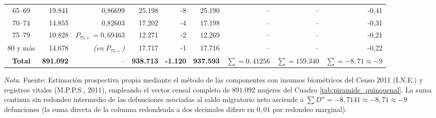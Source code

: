 \documentclass[12pt,letterpaper]{article}
\begin{document}
\begin{table}[htbp]
{\begin{tabular}{crrrrrrrr}
        65--69 & 19.841 & 0,86699 & 25.198 & -8 & 25.190 & -- & -- & -0,41 \\
        70--74 & 14.855 & 0,82603 & 17.202 & -4 & 17.198 & -- & -- & -0,31 \\
        75--79 & 10.828 & $P_{75+} = 0{,}69463$ & 12.271 & -2 & 12.269 & -- & -- & -0,21 \\
        80 y más & 14.678 & \textit{(en $P_{75+}$)} & 17.717 & -1 & 17.716 & -- & -- & -0,22 \\
        \midrule
        \textbf{Total} & \textbf{891.092} & -- & \textbf{938.713} & \textbf{-1.120} & \textbf{937.593} & $\sum = 0{,}41256$ & $\sum = 159.340$ & $\sum = -8{,}71 \approx -9$ \\
        \bottomrule
    \end{tabular}%
    }
    \par\vspace{2pt}\noindent\raggedright \scriptsize \textit{Nota.} Fuente: Estimación prospectiva propia mediante el método de las componentes con insumos biométricos del Censo 2011 (I.N.E.) y registros vitales (M.P.P.S., 2011), empleando el vector censal completo de $891.092$ mujeres del Cuadro \ref{tab:piramide_quinquenal}. La suma continua sin redondeo intermedio de las defunciones asociadas al saldo migratorio neto asciende a $\sum D'' = -8{,}7141 \approx -8{,}71 \approx -9$ defunciones (la suma directa de la columna redondeada a dos decimales difiere en $0{,}01$ por redondeo marginal).
\end{table}
\end{document}
